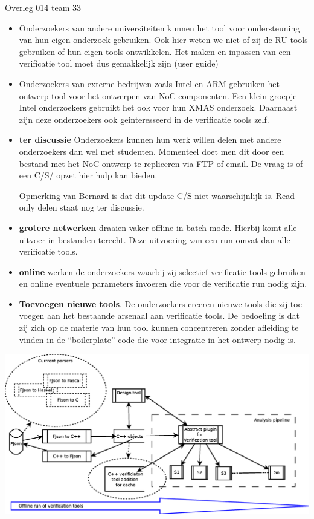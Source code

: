 \documentclass[a4paper,final]{article}
\begin{document}
\begin{Minutes}{Overleg 014 team 33}
\begin{itemize}
	\item Onderzoekers van andere universiteiten kunnen het tool voor
		ondersteuning van hun eigen onderzoek gebruiken. Ook hier weten we niet
		of zij de RU tools gebruiken of hun eigen tools ontwikkelen. Het maken
		en inpassen van een verificatie tool moet dus gemakkelijk zijn (user
		guide)

	\item Onderzoekers van externe bedrijven zoals Intel en ARM gebruiken het
		ontwerp tool voor het ontwerpen van NoC componenten. Een klein groepje
		Intel onderzoekers gebruikt het ook voor hun XMAS onderzoek. Daarnaast
		zijn deze onderzoekers ook geinteresseerd in de verificatie tools zelf.

	\item {\bf ter discussie} Onderzoekers kunnen hun werk willen delen met
		andere onderzoekers dan wel met studenten. Momenteel doet men dit door
		een bestand met het NoC ontwerp te repliceren via FTP of email. De
		vraag is of een C/S/ opzet hier hulp kan bieden. 

		Opmerking van Bernard is dat dit update C/S niet waarschijnlijk is.
		Read-only delen staat nog ter discussie.

	\item {\bf grotere netwerken} draaien vaker offline in batch mode. Hierbij
		komt alle uitvoer in bestanden terecht. Deze uitvoering van een run
		omvat dan alle verificatie tools.

	\item {\bf online} werken de onderzoekers waarbij zij selectief verificatie
		tools gebruiken en online eventuele parameters invoeren die voor de
		verificatie run nodig zijn.

	\item {\bf Toevoegen nieuwe tools}. De onderzoekers creeren nieuwe tools
		die zij toe voegen aan het bestaande arsenaal aan verificatie tools. De
		bedoeling is dat zij zich op de materie van hun tool kunnen
		concentreren zonder afleiding te vinden in de ``boilerplate'' code die
		voor integratie in het ontwerp nodig is. 

\end{itemize}		


\begin{center}
	\includegraphics[width=.9\linewidth]{meeting-2014-11-27/2014-11-27-meeting-architecture-tool}
	\label{fig:architecture-high-level}
\end{center}


\end{Minutes}
\end{document}

